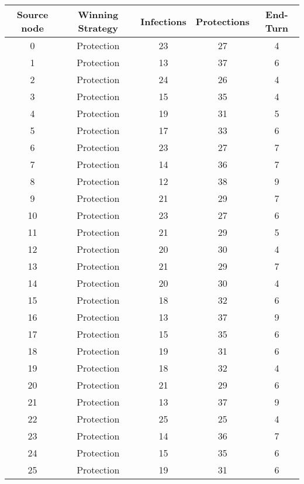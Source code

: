 \documentclass[results.tex]{subfiles}
\begin{document}
\begin{center}
  \begin{tabular}{| c || c | c | c | c |}
    \hline
    {\bfseries Source node} & {\bfseries Winning Strategy} & {\bfseries Infections} & {\bfseries Protections} & {\bfseries End-Turn} \\  %
    \hline\hline
    0 & Protection & 23 & 27 & 4 \\ 
    \hline
    1 & Protection & 13 & 37 & 6 \\ 
    \hline
    2 & Protection & 24 & 26 & 4 \\ 
    \hline
    3 & Protection & 15 & 35 & 4 \\ 
    \hline
    4 & Protection & 19 & 31 & 5 \\ 
    \hline
    5 & Protection & 17 & 33 & 6 \\ 
    \hline
    6 & Protection & 23 & 27 & 7 \\ 
    \hline
    7 & Protection & 14 & 36 & 7 \\ 
    \hline
    8 & Protection & 12 & 38 & 9 \\ 
    \hline
    9 & Protection & 21 & 29 & 7 \\ 
    \hline
    10 & Protection & 23 & 27 & 6 \\ 
    \hline
    11 & Protection & 21 & 29 & 5 \\ 
    \hline
    12 & Protection & 20 & 30 & 4 \\ 
    \hline
    13 & Protection & 21 & 29 & 7 \\ 
    \hline
    14 & Protection & 20 & 30 & 4 \\ 
    \hline
    15 & Protection & 18 & 32 & 6 \\ 
    \hline
    16 & Protection & 13 & 37 & 9 \\ 
    \hline
    17 & Protection & 15 & 35 & 6 \\ 
    \hline
    18 & Protection & 19 & 31 & 6 \\ 
    \hline
    19 & Protection & 18 & 32 & 4 \\ 
    \hline
    20 & Protection & 21 & 29 & 6 \\ 
    \hline
    21 & Protection & 13 & 37 & 9 \\ 
    \hline
    22 & Protection & 25 & 25 & 4 \\ 
    \hline
    23 & Protection & 14 & 36 & 7 \\ 
    \hline
    24 & Protection & 15 & 35 & 6 \\ 
    \hline
    25 & Protection & 19 & 31 & 6 \\ 

\end{tabular}
\end{center}
\end{document}
